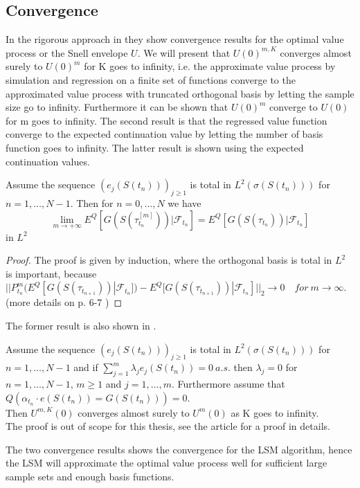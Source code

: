 \subsection{Convergence}
In the rigorous approach in \parencite{analysisLSM} they show convergence results for the optimal value process or the Snell envelope $U$. We will present that $U(0)^{m,K}$ converges almost surely to $U(0)^{m}$ for K goes to infinity, i.e. the approximate value process by simulation and regression on a finite set of functions converge to the approximated value process with truncated orthogonal basis by letting the sample size go to infinity. Furthermore it can be shown that $U(0)^{m}$ converge to $U(0)$ for m goes to infinity. The second result is that the regressed value function converge to the expected continuation value by letting the number of basis function goes to infinity. The latter result is shown using the expected continuation values.
\begin{theorem}\label{LSMConvergence1}
Assume the sequence $(e_{j}(S(t_n)))_{j\geq 1}$ is total in $L^2(\sigma(S(t_n)))$ for $n=1,\ldots,N-1$. Then for $n=0,\ldots,N$ we have
$$\lim_{m\to +\infty} E^Q[G(S(\tau_{t_n}^{[m]})) |\mathcal{F}_{t_n}]=E^Q[G(S(\tau_{t_n})) |\mathcal{F}_{t_n}]$$
in $L^2$
\begin{proof}
The proof is given by induction, where the orthogonal basis is total in $L^2$ is important, because $||P^m_{t_n}(E^Q[G(S(\tau_{t_{n+1}}))|\mathcal{F}_{t_n}])- E^Q[G(S(\tau_{t_{n+1}}))|\mathcal{F}_{t_n}]||_2 \to 0 \quad for \ m \to \infty$.
(more details on p. 6-7 \parencite{analysisLSM})
\end{proof}
\end{theorem}

The former result is also shown in \parencite{analysisLSM}.
\begin{theorem}\label{LSMConvergence2}
Assume the sequence $(e_{j}(S(t_n)))_{j\geq 1}$ is total in $L^2(\sigma(S(t_n)))$ for $n=1,\ldots,N-1$ and if $\sum_{j=1}^{m} \lambda_j e_{j}(S(t_n))=0 \ a.s.$ then $\lambda_j=0$ for $n=1,\ldots,N-1$, $m\geq 1$ and $j=1,\ldots,m$. Furthermore assume that $Q(\alpha_{t_n} \cdot e(S(t_n))=G(S(t_n)))=0$.\\
Then $U^{m,K}(0)$ converges almost surely to $U^{m}(0)$ as K goes to infinity.\\
The proof is out of scope for this thesis, see the article \parencite{analysisLSM} for a proof in details. 
\end{theorem}

The two convergence results shows the convergence for the LSM algorithm, hence the LSM will approximate the optimal value process well for sufficient large sample sets and enough basis functions.


